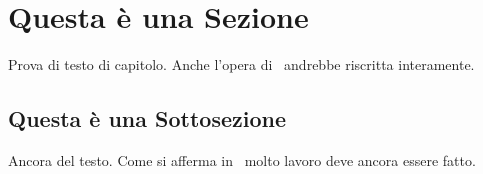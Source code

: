 \section{Questa \`e una Sezione}

Prova di testo di capitolo. Anche l'opera di~\cite{UUID:2005} andrebbe riscritta interamente.

\subsection{Questa \`e una Sottosezione}

Ancora del testo. Come si afferma in~\cite{jones96analysis} molto lavoro deve ancora essere fatto.
